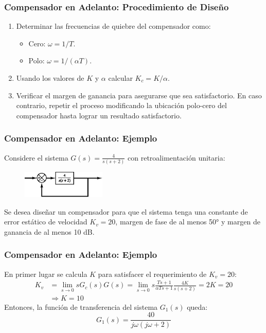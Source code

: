 \documentclass[aspectratio=169, handout]{beamer}
\theoremstyle{definition}
\theoremstyle{plain}
\theoremstyle{remark}
\newcounter{saveenumi}
\newcommand{\seti}{\setcounter{saveenumi}{\value{enumi}}}
\newcommand{\conti}{\setcounter{enumi}{\value{saveenumi}}}
\begin{document}
\begin{frame}[<+->]\frametitle{Compensador en Adelanto: Procedimiento de Diseño}
	\begin{enumerate}
		\conti
		\item Determinar las frecuencias de quiebre del compensador como:
		\begin{itemize}
			\item Cero: $\omega = 1/T$.
			\item Polo: $\omega = 1/(\alpha T)$.
		\end{itemize}
		\item Usando los valores de $K$ y $\alpha$ calcular $K_c = K/\alpha$.
		\item Verificar el margen de ganancia para asegurarse que sea satisfactorio. En caso contrario, repetir el proceso modificando la ubicación polo-cero del compensador hasta lograr un resultado satisfactorio.
		\seti
	\end{enumerate}
\end{frame}

\begin{frame}[<+->]\frametitle{Compensador en Adelanto: Ejemplo}
	Considere el sistema $G(s) = \frac{4}{s(s+2)}$ con retroalimentación unitaria:
	\begin{figure}
		\centering
		\includegraphics[width=4cm]{images/leadCompExampleSystem.eps}
	\end{figure}
	Se desea diseñar un compensador para que el sistema tenga una constante de error estático de velocidad $K_v = 20$, margen de fase de al menos \ang{50} y margen de ganancia de al menos 10 dB.
\end{frame}

\begin{frame}[<+->]\frametitle{Compensador en Adelanto: Ejemplo}
	En primer lugar se calcula $K$ para satisfacer el requerimiento de $K_v = 20$:
	\begin{align*}
		K_v &= \lim_{s\rightarrow 0} sG_c(s)G(s) = \lim_{s \rightarrow 0} s\frac{Ts+1}{\alpha T s + 1} \frac{4K}{s(s+2)} = 2K = 20\\
		&\Rightarrow K = 10
	\end{align*}
	\pause
	Entonces, la función de transferencia del sistema $G_1(s)$ queda:
	\begin{equation*}
		G_1(s) = \frac{40}{j\omega(j\omega+2)}
	\end{equation*}
\end{frame}
\end{document}
